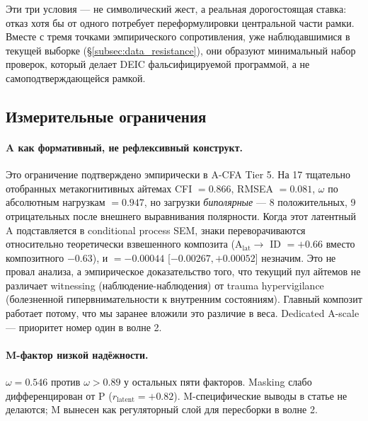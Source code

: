 Эти три условия --- не символический жест, а реальная дорогостоящая ставка: отказ хотя бы от одного потребует переформулировки центральной части рамки. Вместе с тремя точками эмпирического сопротивления, уже наблюдавшимися в текущей выборке (§\ref{subsec:data_resistance}), они образуют минимальный набор проверок, который делает DEIC фальсифицируемой программой, а не самоподтверждающейся рамкой.

\subsection{Измерительные ограничения}

\paragraph{A как формативный, не рефлексивный конструкт.} Это ограничение подтверждено эмпирически в A-CFA Tier 5. На 17 тщательно отобранных метакогнитивных айтемах CFI $= 0.866$, RMSEA $= 0.081$, $\omega$ по абсолютным нагрузкам $= 0.947$, но загрузки \emph{биполярные} --- 8 положительных, 9 отрицательных после внешнего выравнивания полярности. Когда этот латентный A подставляется в conditional process SEM, знаки переворачиваются относительно теоретически взвешенного композита (A$_{\mathrm{lat}} \to$ ID $= +0.66$ вместо композитного $-0.63$), и \IMM{} $= -0.00044$ [$-0.00267, +0.00052$] незначим. Это не провал анализа, а эмпирическое доказательство того, что текущий пул айтемов не различает witnessing (наблюдение-наблюдения) от trauma hypervigilance (болезненной гипервнимательности к внутренним состояниям). Главный композит работает потому, что мы заранее вложили это различие в веса. Dedicated A-scale --- приоритет номер один в волне 2.

\paragraph{M-фактор низкой надёжности.} $\omega = 0.546$ против $\omega > 0.89$ у остальных пяти факторов. Masking слабо дифференцирован от P ($r_{\mathrm{latent}} = +0.82$). M-специфические выводы в статье не делаются; M вынесен как регуляторный слой для пересборки в волне 2.

